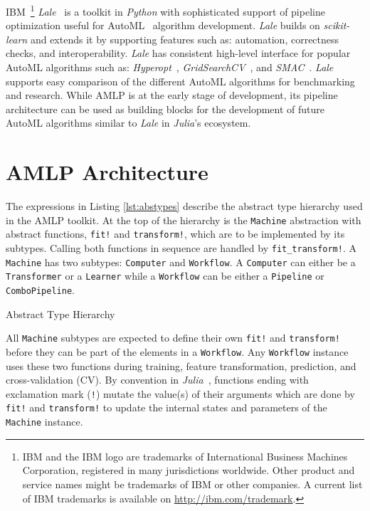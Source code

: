 \documentclass{juliacon}
\begin{document}
IBM~\footnote{IBM and the IBM logo are trademarks of International Business Machines Corporation, registered in many jurisdictions worldwide. Other product and service names might be trademarks of IBM or other companies. A current list of IBM trademarks is available on \url{http://ibm.com/trademark}.} \emph{Lale}~\cite{lale} is a toolkit in \emph{Python} with sophisticated
support of pipeline optimization useful for AutoML~\cite{Liu:AAAI2020}
algorithm development.  \emph{Lale} builds on \emph{scikit-learn} and
extends it by supporting features such as: automation, correctness checks, and
interoperability.  \emph{Lale} has consistent high-level interface for popular
AutoML algorithms such as:
\emph{Hyperopt}~\cite{bergstra2011nips,bergstra2012},
\emph{GridSearchCV}~\cite{pedregosa2011}, and
\emph{SMAC}~\cite{hutter2011smac}.  \emph{Lale} supports
easy comparison of the different AutoML algorithms for benchmarking and research.
While AMLP is at the early stage of development, its
pipeline architecture can be used as building blocks for the development of
future AutoML algorithms similar to \emph{Lale} in \emph{Julia}'s
ecosystem.

\section{AMLP Architecture}
\label{amlparchitecture}

The expressions in Listing \ref{lst:abstypes} describe the abstract type hierarchy
used in the AMLP toolkit. At the top of the hierarchy is the \texttt{Machine}
abstraction with abstract functions, \texttt{fit!} and \texttt{transform!}, which are to be
implemented by its subtypes. Calling both functions in sequence are handled by
\texttt{fit\_transform!}.  A \texttt{Machine} has two subtypes:
\texttt{Computer} and \texttt{Workflow}.  A \texttt{Computer} can either be a
\texttt{Transformer} or a \texttt{Learner} while a \texttt{Workflow} can be
either a \texttt{Pipeline} or  \texttt{ComboPipeline}.

\begin{lstfloat}[htbp]
  
  \caption{Abstract Type Hierarchy}
  \label{lst:abstypes}
\end{lstfloat}

\vskip 6pt

All \texttt{Machine} subtypes are expected to define their own \texttt{fit!}
and \texttt{transform!}  before they can be part of the elements in a
\texttt{Workflow}. Any \texttt{Workflow} instance uses these two functions
during training, feature transformation, prediction,
and cross-validation (CV). By
convention in \emph{Julia}~\cite{bezanson2017julia}, functions ending
with exclamation mark (\texttt{!}) mutate the value(s) of their arguments which
are done by \texttt{fit!} and \texttt{transform!}
to update the internal states and parameters of the
\texttt{Machine} instance.
\end{document}
